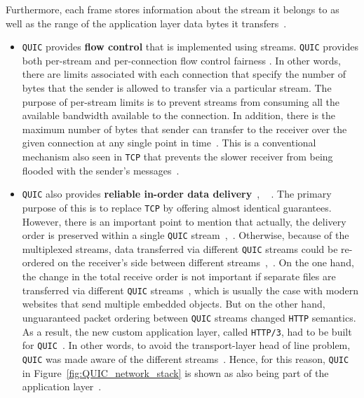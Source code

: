 \documentclass[12pt,a4paper,twoside,openright]{report}
\begin{document}
  Furthermore, each frame stores information about the stream it belongs to as well as the range of the application layer data bytes it transfers~\cite{UnderstandQUIC}.
  \begin{itemize}
  
  
  \item \texttt{QUIC} provides \textbf{flow control} that is implemented using streams.
  \texttt{QUIC} provides both per-stream and per-connection flow control fairness \cite{ietf-quic-transport-draft-32}.
  In other words, there are limits associated with each connection that specify the number of bytes that the sender is allowed to transfer via a particular stream.
  The purpose of per-stream limits is to prevent streams from consuming all the available bandwidth available to the connection.
  In addition, there is the maximum number of bytes that sender can transfer to the receiver over the given connection at any single point in time~\cite{ietf-quic-transport-draft-32}.
  This is a conventional mechanism also seen in \texttt{TCP} that prevents the slower receiver from being flooded with the sender's messages~\cite{ietf-quic-transport-draft-32}.
  
  
    \item \texttt{QUIC} also provides \textbf{reliable in-order data delivery}~\cite[Section 7]{ietf-quic-transport-draft-32}, ~\cite{head-of-line-blocking-in-quic-and-http-3-the-details} .
    The primary purpose of this is to replace \texttt{TCP} by offering almost identical guarantees. 
    However, there is an important point to mention that actually, the delivery order is preserved within a single \texttt{QUIC} stream~\cite{head-of-line-blocking-in-quic-and-http-3-the-details},~\cite[Section 2]{ietf-quic-transport-draft-32}.
    Otherwise, because of the multiplexed streams, data transferred via different \texttt{QUIC} streams could be re-ordered on the receiver's side between different streams~\cite{head-of-line-blocking-in-quic-and-http-3-the-details},~\cite[Section 2]{ietf-quic-transport-draft-32}.
    On the one hand, the change in the total receive order is not important if separate files are transferred via different \texttt{QUIC} streams~\cite{head-of-line-blocking-in-quic-and-http-3-the-details}, which is usually the case with modern websites that send multiple embedded objects.
    But on the other hand, unguaranteed packet ordering between \texttt{QUIC} streams changed \texttt{HTTP} semantics.
    As a result, the new custom application layer, called \texttt{HTTP/3}, had to be built for \texttt{QUIC}~\cite{head-of-line-blocking-in-quic-and-http-3-the-details}.
    In other words, to avoid the transport-layer head of line problem, \texttt{QUIC} was made aware of the different streams~\cite{head-of-line-blocking-in-quic-and-http-3-the-details}.
    Hence, for this reason, \texttt{QUIC} in Figure~\ref{fig:QUIC_network_stack} is shown as also being part of the application layer~\cite{head-of-line-blocking-in-quic-and-http-3-the-details}.
    

\end{itemize}
\end{document}
